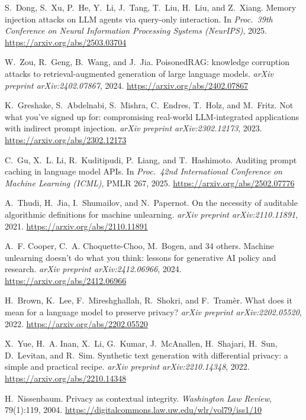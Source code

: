  S.~Dong, S.~Xu, P.~He, Y.~Li, J.~Tang, T.~Liu, H.~Liu, and Z.~Xiang.
Memory injection attacks on LLM agents via query-only interaction. In \emph{Proc.\ 39th Conference on
Neural Information Processing Systems (NeurIPS)}, 2025. \url{https://arxiv.org/abs/2503.03704}

 W.~Zou, R.~Geng, B.~Wang, and J.~Jia. PoisonedRAG: knowledge
corruption attacks to retrieval-augmented generation of large language models. \emph{arXiv
preprint arXiv:2402.07867}, 2024. \url{https://arxiv.org/abs/2402.07867}

 K.~Greshake, S.~Abdelnabi, S.~Mishra, C.~Endres, T.~Holz, and
M.~Fritz. Not what you've signed up for: compromising real-world LLM-integrated applications
with indirect prompt injection. \emph{arXiv preprint arXiv:2302.12173}, 2023.
\url{https://arxiv.org/abs/2302.12173}

 C.~Gu, X.~L. Li, R.~Kuditipudi, P.~Liang, and T.~Hashimoto. Auditing
prompt caching in language model APIs. In \emph{Proc.\ 42nd International Conference on Machine
Learning (ICML)}, PMLR 267, 2025. \url{https://arxiv.org/abs/2502.07776}

 A.~Thudi, H.~Jia, I.~Shumailov, and N.~Papernot. On the necessity
of auditable algorithmic definitions for machine unlearning. \emph{arXiv preprint
arXiv:2110.11891}, 2021. \url{https://arxiv.org/abs/2110.11891}

 A.~F. Cooper, C.~A. Choquette-Choo, M.~Bogen, and 34 others.
Machine unlearning doesn't do what you think: lessons for generative AI policy and research.
\emph{arXiv preprint arXiv:2412.06966}, 2024. \url{https://arxiv.org/abs/2412.06966}

 H.~Brown, K.~Lee, F.~Mireshghallah, R.~Shokri, and F.~Tram\`er. What
does it mean for a language model to preserve privacy? \emph{arXiv preprint arXiv:2202.05520},
2022. \url{https://arxiv.org/abs/2202.05520}

 X.~Yue, H.~A. Inan, X.~Li, G.~Kumar, J.~McAnallen, H.~Shajari,
H.~Sun, D.~Levitan, and R.~Sim. Synthetic text generation with differential privacy: a simple
and practical recipe. \emph{arXiv preprint arXiv:2210.14348}, 2022.
\url{https://arxiv.org/abs/2210.14348}

 H.~Nissenbaum. Privacy as contextual integrity. \emph{Washington Law
Review}, 79(1):119, 2004.
\url{https://digitalcommons.law.uw.edu/wlr/vol79/iss1/10}

